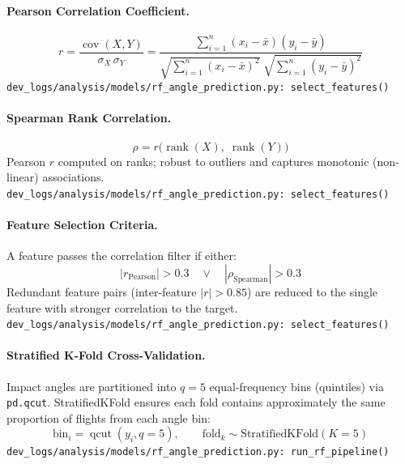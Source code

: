 \paragraph{Pearson Correlation Coefficient.}
\begin{equation}
    r = \frac{\operatorname{cov}(X, Y)}{\sigma_X\,\sigma_Y}
    = \frac{\sum_{i=1}^{n}(x_i - \bar{x})(y_i - \bar{y})}
           {\sqrt{\sum_{i=1}^{n}(x_i - \bar{x})^2}\;\sqrt{\sum_{i=1}^{n}(y_i - \bar{y})^2}}
\end{equation}
\texttt{\small dev\_logs/analysis/models/rf\_angle\_prediction.py:\ select\_features()}

\medskip
\paragraph{Spearman Rank Correlation.}
\begin{equation}
    \rho = r\bigl(\operatorname{rank}(X),\; \operatorname{rank}(Y)\bigr)
\end{equation}
Pearson $r$ computed on ranks; robust to outliers and captures monotonic (non-linear) associations.\\
\texttt{\small dev\_logs/analysis/models/rf\_angle\_prediction.py:\ select\_features()}

\medskip
\paragraph{Feature Selection Criteria.}
A feature passes the correlation filter if either:
\begin{equation}
    |r_{\text{Pearson}}| > 0.3 \quad\lor\quad |\rho_{\text{Spearman}}| > 0.3
\end{equation}
Redundant feature pairs (inter-feature $|r| > 0.85$) are reduced to the single feature with stronger correlation to the target.\\
\texttt{\small dev\_logs/analysis/models/rf\_angle\_prediction.py:\ select\_features()}

\medskip
\paragraph{Stratified K-Fold Cross-Validation.}
Impact angles are partitioned into $q = 5$ equal-frequency bins (quintiles) via \texttt{pd.qcut}. StratifiedKFold ensures each fold contains approximately the same proportion of flights from each angle bin:
\begin{equation}
    \text{bin}_i = \operatorname{qcut}(y_i, q=5),\qquad \text{fold}_k \sim \text{StratifiedKFold}(K=5)
\end{equation}
\texttt{\small dev\_logs/analysis/models/rf\_angle\_prediction.py:\ run\_rf\_pipeline()}

